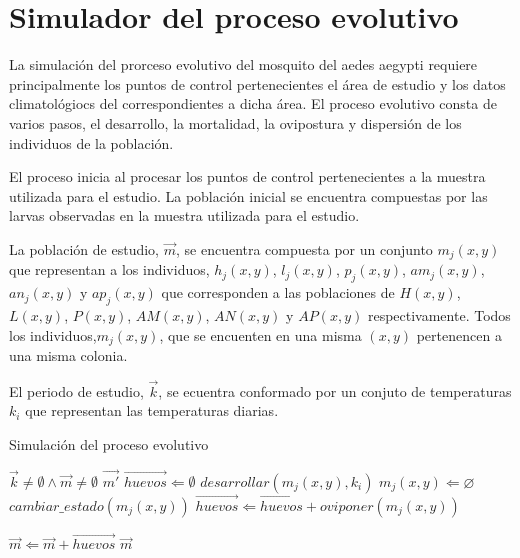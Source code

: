 \section{Simulador del proceso evolutivo}
\label{sec:cap4-simulador-proceso-evolutivo}
La simulación del prorceso evolutivo del mosquito del aedes aegypti requiere principalmente los
puntos de control pertenecientes el área de estudio y los datos climatológiocs del correspondientes
a dicha área. El proceso evolutivo consta de varios pasos, el desarrollo, la mortalidad,
la ovipostura y dispersión de los individuos de la población.

El proceso inicia al procesar los puntos de control pertenecientes a la muestra utilizada para el
estudio. La población inicial se encuentra compuestas por las larvas observadas en la muestra
utilizada para el estudio.

La población de estudio, $\vec{m}$, se encuentra compuesta por un conjunto $m_{j}(x,y)$ que representan a los individuos, $h_{j}(x,y)$, $l_{j}(x,y)$, $p_{j}(x,y)$, $am_{j}(x,y)$,
$an_{j}(x,y)$ y $ap_{j}(x,y)$ que corresponden a las poblaciones de $H(x,y)$, $L(x,y)$, $P(x,y)$,
$AM(x,y)$, $AN(x,y)$ y $AP(x,y)$ respectivamente. Todos los individuos,$m_{j}(x,y)$, que se
encuenten en una misma $(x, y)$ pertenencen a una misma colonia.

El periodo de estudio, $\vec{k}$, se ecuentra conformado por un conjuto de temperaturas $k_{i}$
que representan las temperaturas diarias.

\begin{algorithm}
\caption{Simulación del proceso evolutivo}
\label{alg:simulador-evolutivo}
\begin{algorithmic}[1]
    \REQUIRE $\vec{k}\neq \emptyset \land \vec{m} \neq \emptyset$
    \ENSURE $\vec{m'}$
        \STATE $\vec{huevos} \Leftarrow \emptyset$
            \STATE $desarrollar(m_{j}(x, y), k_{i})$
                \STATE {}
                \STATE $m_{j}(x, y) \Leftarrow \varnothing $
                \STATE $ cambiar\_estado(m_{j}(x, y)) $
                \STATE $\vec{huevos} \Leftarrow \vec{huevos} + oviponer(m_{j}(x, y))$
            \ENDIF
        \ENDFOR

            \STATE {}
            \STATE $\vec{m} \Leftarrow  \vec{m} + \vec{huevos}$
        \ENDIF
    \ENDFOR
    \RETURN $\vec{m}$
\end{algorithmic}
\end{algorithm}

